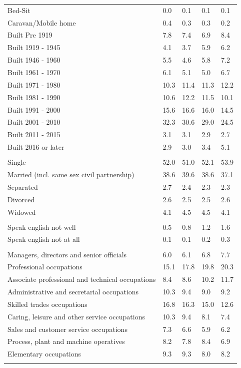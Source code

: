 \documentclass{article}
\begin{document}
\begin{table}[h]
\begin{tabular}{KTTTT}
Bed-Sit & 0.0& 0.1& 0.1& 0.1\\
Caravan/Mobile home & 0.4& 0.3& 0.3& 0.2\\
    \hline
Built Pre 1919 & 7.8& 7.4& 6.9& 8.4\\
Built 1919 - 1945 & 4.1& 3.7& 5.9& 6.2\\
Built  1946 - 1960 & 5.5& 4.6& 5.8& 7.2\\
Built  1961 - 1970 & 6.1& 5.1& 5.0& 6.7\\
Built  1971 - 1980 & 10.3& 11.4& 11.3& 12.2\\
Built  1981 - 1990 & 10.6& 12.2& 11.5& 10.1\\
Built  1991 - 2000 & 15.6& 16.6& 16.0& 14.5\\
Built  2001 - 2010 & 32.3& 30.6& 29.0& 24.5\\
Built  2011 - 2015 & 3.1& 3.1& 2.9& 2.7\\
Built  2016 or later & 2.9& 3.0& 3.4& 5.1\\
\hline
    \\
    \hline
Single & 52.0& 51.0& 52.1& 53.9\\
Married (incl. same sex civil partnership) & 38.6& 39.6& 38.6& 37.1\\
Separated  & 2.7& 2.4& 2.3& 2.3\\
Divorced  & 2.6& 2.5& 2.5& 2.6\\
Widowed & 4.1& 4.5& 4.5& 4.1\\
\hline
    \\ 
    \hline
Speak english not well & 0.5& 0.8& 1.2& 1.6\\
Speak english not at all & 0.1& 0.1& 0.2& 0.3\\
\hline
    \\
    \hline
Managers, directors and senior officials & 6.0& 6.1& 6.8& 7.7\\
Professional occupations & 15.1& 17.8& 19.8& 20.3\\
Associate professional and technical occupations &  8.4&  8.6& 10.2& 11.7\\
Administrative and secretarial occupations & 10.3&  9.4&  9.0&  9.2\\
Skilled trades occupations & 16.8& 16.3& 15.0& 12.6\\
Caring, leisure and other service occupations & 10.3&  9.4&  8.1&  7.4\\
Sales and customer service occupations & 7.3& 6.6& 5.9& 6.2\\
Process, plant and machine operatives & 8.2& 7.8& 8.4& 6.9\\
Elementary occupations & 9.3& 9.3& 8.0& 8.2\\
\hline
\end{tabular}
\end{table}
\end{document}
